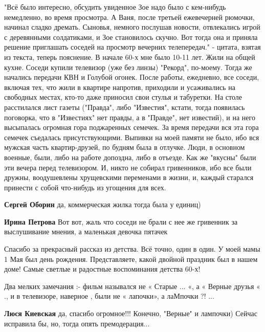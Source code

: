 \begin{itemize}
"Всё было интересно, обсудить увиденное Зое надо было с кем-нибудь немедленно,
во время просмотра. А Ваня, после третьей ежевечерней рюмочки, начинал сладко
дремать. Сыновья, немного послушав новости, отвлекались игрой с деревянными
солдатиками, и Зое становилось скучно. Вот тогда она и приняла решение
приглашать соседей на просмотр вечерних телепередач." - цитата, взятая из
текста, теперь пояснение. В начале 60-х мне было 10-11 лет. Жили на общей
кухне. Соседи купили телевизор (уже без линзы) "Рекорд", по-моему. Тогда же
начались передачи КВН и Голубой огонек. После работы, ежедневно, все соседи,
включая тех, что жили в квартире напротив, приходили и усаживались на свободных
местах, кто-то даже приносил свои стулья и табуретки. На столе расстилался лист
газеты ("Правда", либо "Известия", кстати, тогда появилась поговорка, что в
"Известиях" нет правды, а в "Правде", нет известий), и на него высыпалась
огромная гора поджаренных семечек. За время передачи вся эта гора семечек
съедалась присутствующими. Выпивки на моей памяти не было, ибо вся мужская
часть квартир-друзей, по будням была в отлучке. Люди, в основном военные, были,
либо на работе допоздна, либо в отъезде. Как же "вкусны" были эти вечера перед
телевизором. И, никто не собирал гривенников, ибо все были дружны, воодушевлены
хрущевскими переменами в жизни, и, каждый старался принести с собой что-нибудь
из угощения для всех.

\begin{itemize} %
\textbf{Сергей Оборин} да, коммерческая жилка тогда была у единиц)

\textbf{Ирина Петрова} Вот вот, жаль что соседи не брали с нее же гривенник за выслушивание мнения, а
маленькая девочка пятачек
\end{itemize} %


Спасибо за прекрасный рассказ из детства.
Всё точно, один в один.
У моей мамы 1 Мая был день рождения.
Представляете, какой двойной праздник был в нашем доме!
Самые светлые и радостные воспоминания детства 60-х!


Два мелких замечания :- фильм назывался не « Старые ... «, а « Верные друзья « .,
и в телевизоре, наверное , были не « лапочки», а лаМпочки ?! ...

\begin{itemize} %
\textbf{Люся Киевская} да, спасибо огромное!!! Конечно, "Верные" и лампочки) Сейчас исправила бы, но, тогда опять премодерация...
\end{itemize} %


\end{itemize}
